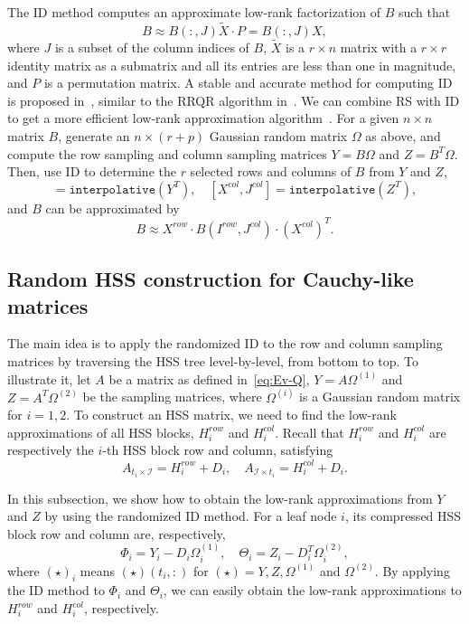 \documentclass[times]{nlaauth}
\newcounter{algorithm}
\begin{document}
The ID method computes an approximate low-rank factorization of $B$ such that
\[
B \approx B(:,J) \widetilde{X} \cdotp P =B(:,J)X,
\]
where $J$ is a subset of the column indices of $B$, $\widetilde{X}$ is a $r\times n$ matrix with
a $r\times r$ identity matrix as a submatrix and all its entries are less than one in
magnitude, and $P$ is a permutation matrix.
A stable and accurate method for computing ID is proposed in~\cite{Cheng-Random}, similar
to the RRQR algorithm in~\cite{Gu-RRQR}.
We can combine RS with ID to get a more efficient low-rank approximation algorithm~\cite{Martinsson-PNAS07}.
For a given $n\times n$ matrix $B$, generate an $n\times (r+p)$ Gaussian random matrix $\Omega$ as above, and compute
the row sampling and column sampling matrices $Y=B\Omega$ and $Z = B^T \Omega$.
Then, use ID to determine the $r$ selected rows and columns of $B$ from $Y$ and $Z$,
\begin{equation}
[X^{row}, I^{row}] = \texttt{interpolative}(Y^T), \quad
[X^{col},J^{col}] = \texttt{interpolative}(Z^T),
\end{equation}
and $B$ can be approximated by
\[
B \approx X^{row} \cdotp B(I^{row},J^{col}) \cdotp (X^{col})^T.
\]

\subsection{Random HSS construction for Cauchy-like matrices}
\label{sec:rhss-cauchy}

The main idea is to apply the randomized ID to the row and column sampling matrices by
traversing the HSS tree level-by-level, from bottom to top.
To illustrate it, let $A$ be a matrix as defined in~\eqref{eq:Ev-Q}, $Y=A\Omega^{(1)}$ and $Z=A^T\Omega^{(2)}$
be the sampling matrices, where $\Omega^{(i)}$ is a Gaussian random matrix for $i=1,2$.
To construct an HSS matrix, we need to find the low-rank approximations of all HSS blocks, $H_i^{row}$ and
$H_i^{col}$. Recall that $H_i^{row}$ and $H_i^{col}$ are respectively the $i$-th HSS block row and column,
satisfying
\begin{equation}
A_{t_i\times \mathcal{I}} = H_i^{row}+D_i, \quad A_{\mathcal{I}\times t_i} = H_i^{col}+D_i.
\end{equation}

In this subsection, we show how to obtain the low-rank approximations from $Y$ and $Z$ by using the randomized ID method.
For a leaf node $i$, its compressed HSS block row and column are, respectively,
\[
\Phi_i=Y_i-D_i\Omega_i^{(1)}, \quad \Theta_i=Z_i-D_i^T\Omega_i^{(2)},
\]
where $(\star)_i$ means $(\star)(t_i,:)$ for $( \star )=Y,Z,\Omega^{(1)}$ and $\Omega^{(2)}$.
By applying the ID method to $\Phi_i$ and $\Theta_i$, we can easily obtain the low-rank approximations to $H_i^{row}$ and
$H_i^{col}$, respectively.
\end{document}
